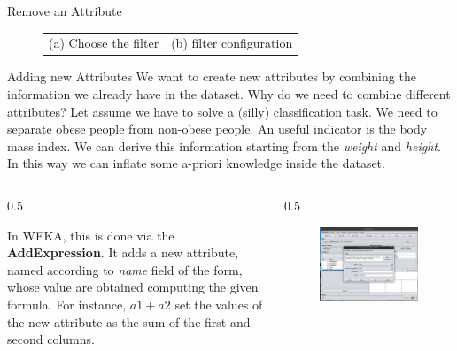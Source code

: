 \documentclass{beamer}
\newcommand{\cols}[4]{
	\begin{columns}[t]
	\begin{column}{#1\textwidth}
		#3
	\end{column}
	\begin{column}{#2\textwidth}
		#4
	\end{column}
	\end{columns}
	
}
\begin{document}
\begin{frame}[t]{Remove an Attribute}
\begin{figure}
\begin{tabular}{lr}
(a) Choose the filter & (b) filter configuration
\end{tabular}
\end{figure}
\end{frame}

\begin{frame}{Adding new Attributes}
We want to create new attributes by combining the information we already
have in the dataset.
\pause
{\color{red} Why do we need to combine different attributes?}
\pause
Let assume we have to solve a (silly) classification task. We need to
separate obese people from non-obese people. 
An useful indicator is the body mass index. We can derive this information
starting from the \textit{weight} and \textit{height}.
In this way we can inflate some a-priori knowledge inside the dataset.
\cols{0.5}{0.5}{

In WEKA, this is done via the \textbf{AddExpression}. 
It adds a new attribute, named according to 
\textit{name} field of the form, whose value are obtained
computing the given formula. For instance, $a1+a2$
set the values of the new attribute as the sum of the first and second
columns.
}
{
\begin{figure}[t]
\includegraphics[scale=0.12]{img/add.png}
\end{figure}
}
\end{frame}
\end{document}
